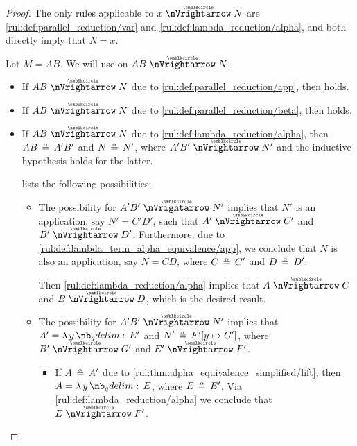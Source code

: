 \begin{proof}
   The only rules applicable to \( x \ppred N \) are \ref{rul:def:parallel_reduction/var} and \ref{rul:def:lambda_reduction/alpha}, and both directly imply that \( N = x \).

   Let \( M = AB \). We will use  on \( AB \ppred N \):
  \begin{itemize}
    \item If \( AB \ppred N \) due to \ref{rul:def:parallel_reduction/app}, then  holds.

    \item If \( AB \ppred N \) due to \ref{rul:def:parallel_reduction/beta}, then  holds.

    \item If \( AB \ppred N \) due to \ref{rul:def:lambda_reduction/alpha}, then \( AB \aequiv A' B' \) and \( N \aequiv N' \), where \( A' B' \ppred N' \) and the inductive hypothesis holds for the latter.

     lists the following possibilities:
    \begin{itemize}
      \item The possibility  for \( A' B' \ppred N' \) implies that \( N' \) is an application, say \( N' = C' D' \), such that \( A' \ppred C' \) and \( B' \ppred D' \). Furthermore, due to \ref{rul:def:lambda_term_alpha_equivalence/app}, we conclude that \( N \) is also an application, say \( N = CD \), where \( C \aequiv C' \) and \( D \aequiv D' \).

      Then \ref{rul:def:lambda_reduction/alpha} implies that \( A \ppred C \) and \( B \ppred D \), which is the desired result.

      \item The possibility  for \( A' B' \ppred N' \) implies that \( A' = \qabs y E' \) and \( N' \aequiv F'[y \mapsto G'] \), where \( B' \ppred G' \) and \( E' \ppred F' \).

      \begin{itemize}
        \item If \( A \aequiv A' \) due to \ref{rul:thm:alpha_equivalence_simplified/lift}, then \( A = \qabs y E \), where \( E \aequiv E' \). Via \ref{rul:def:lambda_reduction/alpha} we conclude that \( E \ppred F' \).


\end{itemize}
\end{itemize}
\end{itemize}
\end{proof}
